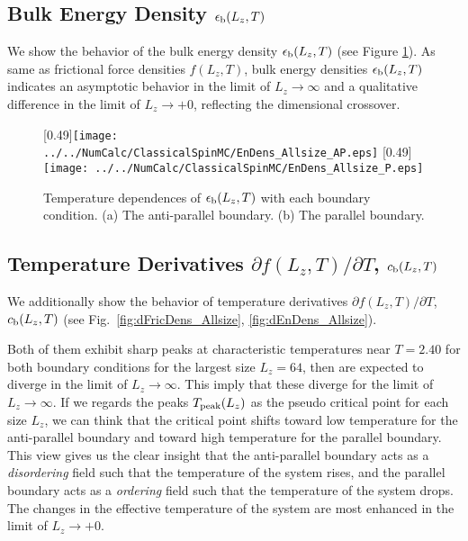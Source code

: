 
\subsection{Bulk Energy Density $\epsilon_{\rm b}(L_{z}, T)$}

We show the behavior of the bulk energy density $\epsilon_{\rm b}(L_{z}, T)$ (see Figure \ref{fig:EnDens_Allsize}). As same as frictional force densities $f(L_{z}, T)$, bulk energy densities $\epsilon_{\rm b}(L_{z}, T)$ indicates an asymptotic behavior in the limit of $L_{z}\to\infty$ and a qualitative difference in the limit of $L_{z}\to+0$, reflecting the dimensional crossover.

\begin{figure}[htbp]
	\centering
	\subcaptionbox{\label{fig:EnDens_Allsize_AP}}[0.49\linewidth]{\texttt{[image: ../../NumCalc/ClassicalSpinMC/EnDens\_Allsize\_AP.eps]}}
	\subcaptionbox{\label{fig:EnDens_Allsize_P}}[0.49\linewidth]{\texttt{[image: ../../NumCalc/ClassicalSpinMC/EnDens\_Allsize\_P.eps]}}
	
	\caption{Temperature dependences of $\epsilon_{\rm b}(L_{z}, T)$ with each boundary condition. (a) The anti-parallel boundary. (b) The parallel boundary.}
	\label{fig:EnDens_Allsize}
\end{figure}

\subsection{Temperature Derivatives $\partial f(L_{z}, T)/\partial T$, $c_{\rm b}(L_{z}, T)$}

We additionally show the behavior of temperature derivatives $\partial f(L_{z}, T)/\partial T$, $c_{\rm b}(L_{z},T)$ (see Fig.~\ref{fig:dFricDens_Allsize}, \ref{fig:dEnDens_Allsize}).

Both of them exhibit sharp peaks at characteristic temperatures near $T=2.40$ for both boundary conditions for the largest size $L_{z}=64$, then are expected to diverge in the limit of $L_{z}\to\infty$. This imply that these diverge for the limit of $L_{z}\to\infty$. If we regards the peaks $T_{\rm peak}(L_{z})$ as the pseudo critical point for each size $L_{z}$, we can think that the critical point shifts toward low temperature for the anti-parallel boundary and toward high temperature for the parallel boundary. This view gives us the clear insight that the anti-parallel boundary acts as a \textit{disordering} field such that the temperature of the system rises, and the parallel boundary acts as a \textit{ordering} field such that the temperature of the system drops. The changes in the effective temperature of the system are most enhanced in the limit of $L_{z}\to+0$.

